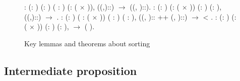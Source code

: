 \begin{figure}
  \begin{coqdoccode}
  \coqdocnoindent
    : \coqdockw{\ensuremath{\forall}} (: ) (: ) ( : ) (:  ( \ensuremath{\times} )),\coqdoceol
  \coqdocindent{1.00em}
   ((,)::) \ensuremath{\rightarrow} ((, )::).\coqdoceol
  \coqdocemptyline
  \coqdocnoindent
    : \coqdockw{\ensuremath{\forall}} (: ) (:  ( \ensuremath{\times} )) (: ) (: ),\coqdoceol
  \coqdocindent{1.00em}
   ((,)::) \ensuremath{\rightarrow}  .\coqdoceol
  \coqdocemptyline
  \coqdocnoindent
    : \coqdockw{\ensuremath{\forall}} (: ) ( :  ( \ensuremath{\times} )) ( : ) ( : ),\coqdoceol
  \coqdocindent{1.00em}
  ((, ):: ++ (, )::) \ensuremath{\rightarrow}  < .\coqdoceol
  \coqdocemptyline
  \coqdocnoindent
    : \coqdockw{\ensuremath{\forall}} (: ) (:  ( \ensuremath{\times} )) (: ) (: ),\coqdoceol
  \coqdocindent{1.00em}
    \ensuremath{\rightarrow}  (   ).\coqdoceol
  \coqdocemptyline
  \end{coqdoccode}
  \caption{Key lemmas and theorems about sorting}
  \label{fig:key_sorting_lemmas}
\end{figure}

\subsection{Intermediate proposition}

